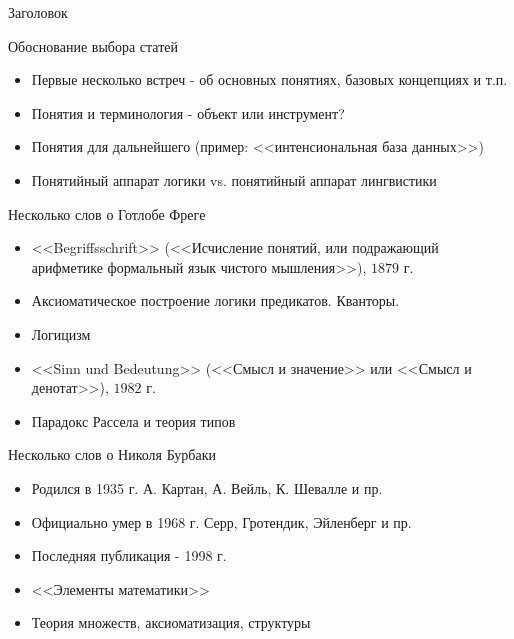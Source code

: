 \documentclass{beamer}
\begin{document}
\begin{frame}{Заголовок}
\end{frame}

\begin{frame}{Обоснование выбора статей}
    \begin{itemize}
        \item Первые несколько встреч - об основных понятиях, базовых концепциях и т.п.
        \item Понятия и терминология - объект или инструмент?
        \item Понятия для дальнейшего (пример: <<интенсиональная база данных>>)
        \item Понятийный аппарат логики vs. понятийный аппарат лингвистики
    \end{itemize}
\end{frame}

\begin{frame}{Несколько слов о Готлобе Фреге}
    \begin{itemize}
        \item <<Begriffsschrift>> (<<Исчисление понятий, или подражающий арифметике формальный язык чистого мышления>>), $1879$ г.
        \item Аксиоматическое построение логики предикатов. Кванторы.
        \item Логицизм
        \item <<Sinn und Bedeutung>> (<<Смысл и значение>> или <<Смысл и денотат>>), $1982$ г.
        \item Парадокс Рассела и теория типов
    \end{itemize}
\end{frame}

\begin{frame}{Несколько слов о Николя Бурбаки}
    \begin{itemize}
        \item Родился в 1935 г. А. Картан, А. Вейль, К. Шевалле и пр.
        \item Официально умер в 1968 г. Серр, Гротендик, Эйленберг и пр.
        \item Последняя публикация - 1998 г.
        \item <<Элементы математики>>
        \item Теория множеств, аксиоматизация, структуры
    \end{itemize}
\end{frame}
\end{document}
